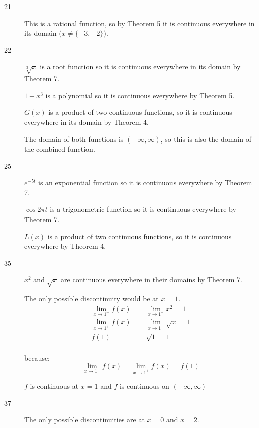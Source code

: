 \documentclass[letterpaper, landscape]{exam}
\begin{document}
\begin{description}
      \item[21] This is a rational function, so by Theorem 5 it is continuous everywhere
        in its domain ($x \neq \{-3, -2\}$).

      \item[22] 
        $\sqrt[3]{x}$ is a root function so it is continuous everywhere in its
        domain by Theorem 7.

        $1 + x^3$ is a polynomial so it is continuous everywhere by Theorem 5.

        $G(x)$ is a product of two continuous functions, so it is continuous
        everywhere in its domain by Theorem 4.

        The domain of both functions is $(-\infty, \infty)$, so this is also the domain of
        the combined function.

      \item[25] 
        
        $e^{-5t}$ is an exponential function so it is continuous everywhere 
        by Theorem 7.

        $\cos 2 \pi t$ is a trigonometric function so it is continuous
        everywhere by Theorem 7.

        $L(x)$ is a product of two continuous functions, so it is continuous
        everywhere by Theorem 4.

      \item[35] $x^2$ and $\sqrt{x}$ are continuous everywhere in their domains
        by Theorem 7.

        The only possible discontinuity would be at $x = 1$.
        \begin{align*}
          \lim_{x \to 1^-} f(x) & = \lim_{x \to 1^-} x^2 = 1 \\
          \lim_{x \to 1^+} f(x) & = \lim_{x \to 1^+} \sqrt{x} = 1 \\
          f(1)                  & = \sqrt{1} = 1 \\
        \end{align*}

        because:
        \[
          \lim_{x \to 1^-} f(x) = \lim_{x \to 1^+} f(x) = f(1) 
        \]

        $f$ is continuous at $x = 1$ and $f$ is continuous on $(-\infty, \infty)$

      \item[37] The only possible discontinuities are at $x = 0$ and $x = 2$.


\end{description}
\end{document}
